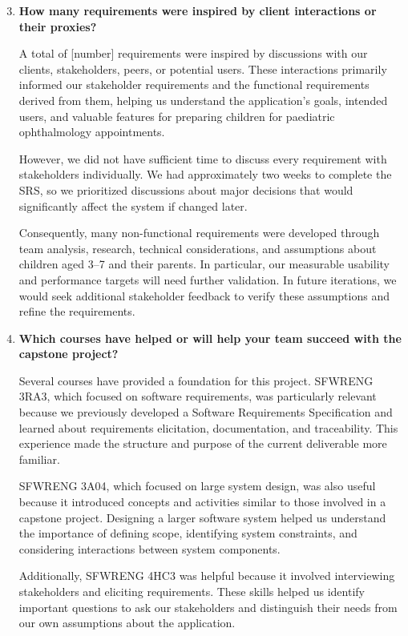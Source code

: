 \documentclass[12pt]{article}
\begin{document}
\begin{enumerate}
    \setcounter{enumi}{2}

    \item \textbf{How many requirements were inspired by client interactions
    or their proxies?}

    A total of [number] requirements were inspired by discussions with our
    clients, stakeholders, peers, or potential users. These interactions
    primarily informed our stakeholder requirements and the functional
    requirements derived from them, helping us understand the application's
    goals, intended users, and valuable features for preparing children
    for paediatric ophthalmology appointments.

    However, we did not have sufficient time to discuss every requirement
    with stakeholders individually. We had approximately two weeks to
    complete the SRS, so we prioritized discussions about major decisions
    that would significantly affect the system if changed later.

    Consequently, many non-functional requirements were developed through
    team analysis, research, technical considerations, and assumptions
    about children aged 3--7 and their parents. In particular, our measurable
    usability and performance targets will need further validation.
    In future iterations, we would seek additional stakeholder feedback
    to verify these assumptions and refine the requirements.

    \item \textbf{Which courses have helped or will help your team
    succeed with the capstone project?}

    Several courses have provided a foundation for this project.
    SFWRENG 3RA3, which focused on software requirements, was particularly
    relevant because we previously developed a Software Requirements
    Specification and learned about requirements elicitation, documentation,
    and traceability. This experience made the structure and purpose of
    the current deliverable more familiar.

    SFWRENG 3A04, which focused on large system design, was also useful
    because it introduced concepts and activities similar to those involved
    in a capstone project. Designing a larger software system helped us
    understand the importance of defining scope, identifying system
    constraints, and considering interactions between system components.

    Additionally, SFWRENG 4HC3 was helpful because it involved interviewing
    stakeholders and eliciting requirements. These skills helped us identify
    important questions to ask our stakeholders and distinguish their needs
    from our own assumptions about the application.


\end{enumerate}
\end{document}

